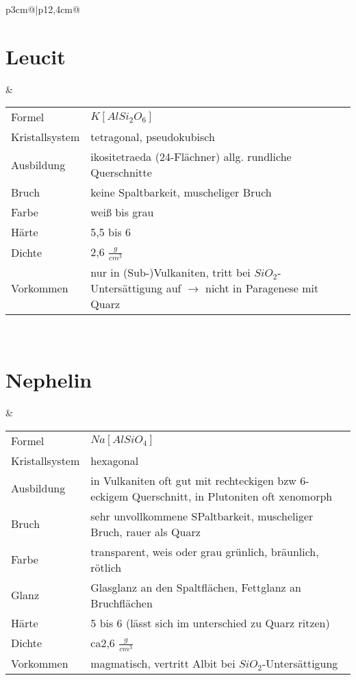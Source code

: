 \documentclass[a4, 12pt]{scrreprt}
\begin{document}
\begin{tabular}{p{3cm}@{}|p{}@{}}
\section{Leucit} & 
\begin{tabular}{p{3cm}@{}p{9cm}@{}}
Formel & $K[AlSi_2O_6]$\\
Kristallsystem & tetragonal, pseudokubisch\\
Ausbildung & ikositetraeda (24-Flächner) allg. rundliche Querschnitte\\
Bruch & keine Spaltbarkeit, muscheliger Bruch\\
Farbe & weiß bis grau\\
Härte &  5,5 bis 6\\
Dichte & 2,6 $\frac{g}{cm^3}$\\
Vorkommen & nur in (Sub-)Vulkaniten, tritt bei $SiO_2$-Untersättigung auf $\rightarrow$ nicht in Paragenese mit Quarz\\
\end{tabular}\\
\hline

\section{Nephelin} & 
\begin{tabular}{p{3cm}@{}p{9cm}@{}}
Formel & $Na[AlSiO_4]$\\
Kristallsystem & hexagonal\\
Ausbildung & in Vulkaniten oft gut mit rechteckigen bzw 6-eckigem Querschnitt, in Plutoniten oft xenomorph\\
Bruch & sehr unvollkommene SPaltbarkeit, muscheliger Bruch, rauer als Quarz\\
Farbe & transparent, weis oder grau grünlich, bräunlich, rötlich \\
Glanz & Glasglanz an den Spaltflächen, Fettglanz an Bruchflächen\\
Härte & 5 bis 6 (lässt sich im unterschied zu Quarz ritzen)\\
Dichte & ca2,6 $\frac{g}{cm^3}$\\
Vorkommen & magmatisch, vertritt Albit bei $SiO_2$-Untersättigung\\
\end{tabular}\\
\hline
\end{tabular}
\newpage
\end{document}
